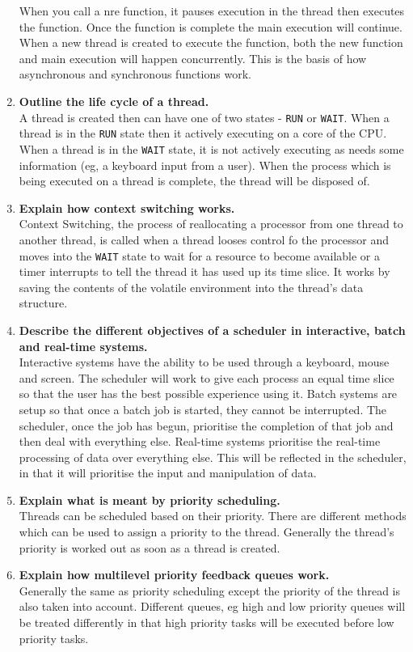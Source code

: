 \begin{enumerate}
    When you call a nre function, it pauses execution in the thread then executes the function. Once the function is complete the main execution will continue. When a new thread is created to execute the function, both the new function and main execution will happen concurrently. This is the basis of how asynchronous and synchronous functions work. 
    \item \textbf{Outline the life cycle of a thread.}\\
    A thread is created then can have one of two states - \verb|RUN| or \verb|WAIT|. When a thread is in the \verb|RUN| state then it actively executing on a core of the CPU. When a thread is in the \verb|WAIT| state, it is not actively executing as needs some information (eg, a keyboard input from a user). When the process which is being executed on a thread is complete, the thread will be disposed of. 
    \item \textbf{Explain how context switching works.}\\
    Context Switching, the process of reallocating a processor from one thread to another thread, is called when a thread looses control fo the processor and moves into the \verb|WAIT| state to wait for a resource to become available or a timer interrupts to tell the thread it has used up its time slice. It works by saving the contents of the volatile environment into the thread's data structure.
    \item \textbf{Describe the different objectives of a scheduler in interactive, batch and real-time systems.}\\
    Interactive systems have the ability to be used through a keyboard, mouse and screen. The scheduler will work to give each process an equal time slice so that the user has the best possible experience using it.
    Batch systems are setup so that once a batch job is started, they cannot be interrupted. The scheduler, once the job has begun, prioritise the completion of that job and then deal with everything else.
    Real-time systems prioritise the real-time processing of data over everything else. This will be reflected in the scheduler, in that it will prioritise the input and manipulation of data. 
    \item \textbf{Explain what is meant by priority scheduling.}\\
    Threads can be scheduled based on their priority. There are different methods which can be used to assign a priority to the thread. Generally the thread's priority is worked out as soon as a thread is created.
    \item \textbf{Explain how multilevel priority feedback queues work.}\\
    Generally the same as priority scheduling except the priority of the thread is also taken into account. Different queues, eg high and low priority queues will be treated differently in that high priority tasks will be executed before low priority tasks. 
\end{enumerate}